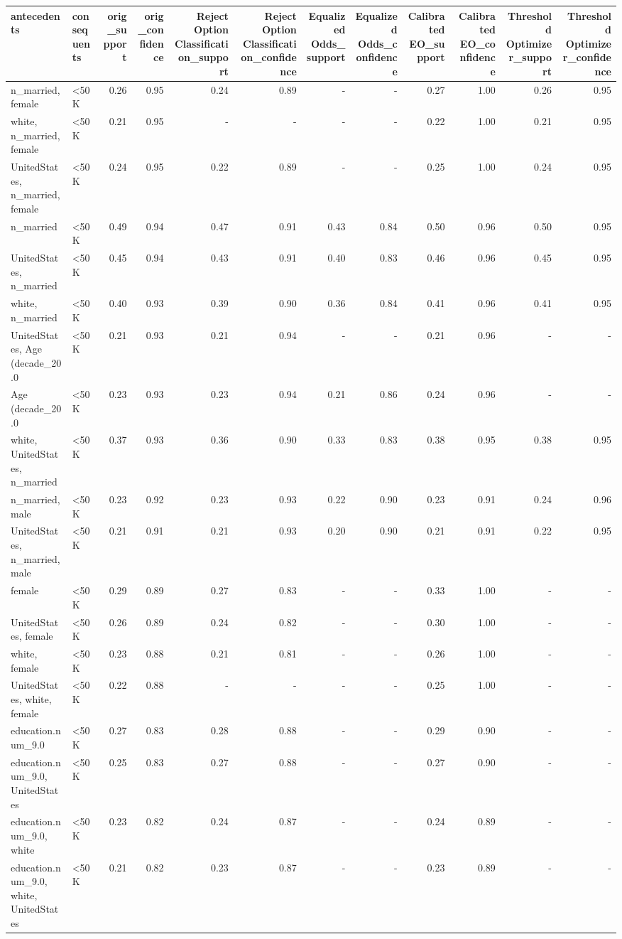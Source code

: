 \begin{tabular}{llrrrrrrrrrr}
\toprule
antecedents & consequents & orig\_support & orig\_confidence & Reject Option Classification\_support & Reject Option Classification\_confidence & Equalized Odds\_support & Equalized Odds\_confidence & Calibrated EO\_support & Calibrated EO\_confidence & Threshold Optimizer\_support & Threshold Optimizer\_confidence \\
\midrule
n\_married, female & <50K & 0.26 & 0.95 & 0.24 & 0.89 & - & - & 0.27 & 1.00 & 0.26 & 0.95 \\
white, n\_married, female & <50K & 0.21 & 0.95 & - & - & - & - & 0.22 & 1.00 & 0.21 & 0.95 \\
UnitedStates, n\_married, female & <50K & 0.24 & 0.95 & 0.22 & 0.89 & - & - & 0.25 & 1.00 & 0.24 & 0.95 \\
n\_married & <50K & 0.49 & 0.94 & 0.47 & 0.91 & 0.43 & 0.84 & 0.50 & 0.96 & 0.50 & 0.95 \\
UnitedStates, n\_married & <50K & 0.45 & 0.94 & 0.43 & 0.91 & 0.40 & 0.83 & 0.46 & 0.96 & 0.45 & 0.95 \\
white, n\_married & <50K & 0.40 & 0.93 & 0.39 & 0.90 & 0.36 & 0.84 & 0.41 & 0.96 & 0.41 & 0.95 \\
UnitedStates, Age (decade\_20.0 & <50K & 0.21 & 0.93 & 0.21 & 0.94 & - & - & 0.21 & 0.96 & - & - \\
Age (decade\_20.0 & <50K & 0.23 & 0.93 & 0.23 & 0.94 & 0.21 & 0.86 & 0.24 & 0.96 & - & - \\
white, UnitedStates, n\_married & <50K & 0.37 & 0.93 & 0.36 & 0.90 & 0.33 & 0.83 & 0.38 & 0.95 & 0.38 & 0.95 \\
n\_married, male & <50K & 0.23 & 0.92 & 0.23 & 0.93 & 0.22 & 0.90 & 0.23 & 0.91 & 0.24 & 0.96 \\
UnitedStates, n\_married, male & <50K & 0.21 & 0.91 & 0.21 & 0.93 & 0.20 & 0.90 & 0.21 & 0.91 & 0.22 & 0.95 \\
female & <50K & 0.29 & 0.89 & 0.27 & 0.83 & - & - & 0.33 & 1.00 & - & - \\
UnitedStates, female & <50K & 0.26 & 0.89 & 0.24 & 0.82 & - & - & 0.30 & 1.00 & - & - \\
white, female & <50K & 0.23 & 0.88 & 0.21 & 0.81 & - & - & 0.26 & 1.00 & - & - \\
UnitedStates, white, female & <50K & 0.22 & 0.88 & - & - & - & - & 0.25 & 1.00 & - & - \\
education.num\_9.0 & <50K & 0.27 & 0.83 & 0.28 & 0.88 & - & - & 0.29 & 0.90 & - & - \\
education.num\_9.0, UnitedStates & <50K & 0.25 & 0.83 & 0.27 & 0.88 & - & - & 0.27 & 0.90 & - & - \\
education.num\_9.0, white & <50K & 0.23 & 0.82 & 0.24 & 0.87 & - & - & 0.24 & 0.89 & - & - \\
education.num\_9.0, white, UnitedStates & <50K & 0.21 & 0.82 & 0.23 & 0.87 & - & - & 0.23 & 0.89 & - & - \\
\bottomrule
\end{tabular}
